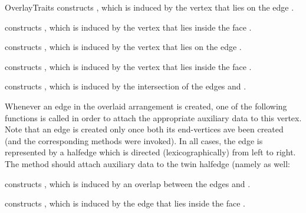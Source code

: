\begin{ccRefConcept}{OverlayTraits}
    {constructs , which is induced by the vertex  that lies on
     the edge .}

    {constructs , which is induced by the vertex  that lies
     inside the face .}

    {constructs , which is induced by the vertex  that lies on
     the edge .}

    {constructs , which is induced by the vertex  that lies
     inside the face .}

    {constructs , which is induced by the intersection of the edges 
      and .}

Whenever an edge in the overlaid arrangement is created, one of the
following functions is called in order to attach the appropriate
auxiliary data to this vertex. Note that an edge is created only once both
its end-vertices ave been created (and the corresponding 
methods were invoked). In all cases, the edge is represented by a halfedge
 which is directed (lexicographically) from left to right. The
 method should attach auxiliary data to the twin halfedge
(namely  as well:

    {constructs , which is induced by an overlap between the edges 
      and .}

    {constructs , which is induced by the edge  that lies
     inside the face .}


\end{ccRefConcept}
